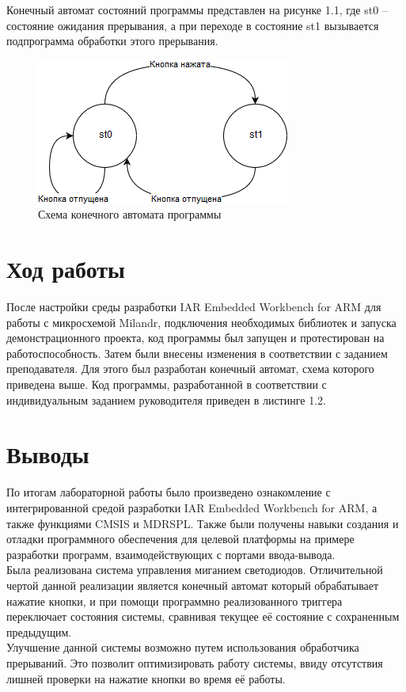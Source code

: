 \documentclass[14pt,a4paper,report]{report}
\begin{document}
Конечный автомат состояний программы представлен на рисунке 1.1, где st0 – состояние ожидания прерывания, а при переходе в состояние st1 вызывается подпрограмма обработки этого прерывания.

\begin{figure}[h!]
	\centering
	\includegraphics[scale = 1]{img/1_1.png}
	\caption{Схема конечного автомата программы}
\end{figure}

\section{Ход работы}

После настройки среды разработки IAR Embedded Workbench for ARM для работы с микросхемой Milandr, подключения необходимых библиотек и запуска демонстрационного проекта, код программы был запущен и протестирован на работоспособность. Затем были внесены изменения в соответствии с заданием преподавателя. Для этого был разработан конечный автомат, схема которого приведена выше. 
Код программы, разработанной в соответствии с индивидуальным заданием руководителя приведен в листинге 1.2. 




\section{Выводы}
По итогам лабораторной работы было произведено ознакомление с интегрированной средой разработки IAR Embedded Workbench for ARM, а также функциями CMSIS и MDRSPL. Также были получены навыки создания и отладки программного обеспечения для целевой платформы на примере разработки программ, взаимодействующих с портами ввода-вывода. \\
\indent Была реализована система управления миганием светодиодов. Отличительной чертой данной реализации является конечный автомат который обрабатывает нажатие кнопки, и при помощи программно реализованного триггера переключает состояния системы, сравнивая текущее её состояние с сохраненным предыдущим. \\
\indent Улучшение данной системы возможно путем использования обработчика прерываний. Это позволит оптимизировать работу системы, ввиду отсутствия лишней проверки на нажатие кнопки во время её работы.
\end{document}
